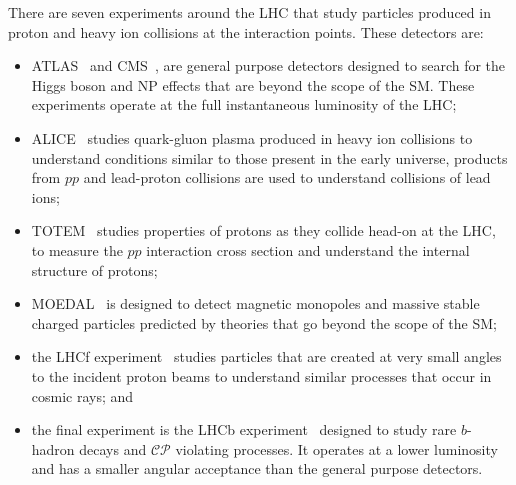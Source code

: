There are seven experiments around the LHC that study particles produced in proton and heavy ion collisions at the interaction points. These detectors are: %
\begin{itemize}
\item ATLAS~\cite{Aad:2008zzm} and CMS~\cite{Chatrchyan:2008aa}, are general purpose detectors designed to search for the Higgs boson and NP effects that are beyond the scope of the SM. These experiments operate at the full instantaneous luminosity of the LHC; %
\item ALICE~\cite{Aamodt:2008zz} studies quark-gluon plasma produced in heavy ion collisions to understand conditions similar to those present in the early universe, products from $pp$ and lead-proton collisions are used to understand collisions of lead ions;
\item  TOTEM~\cite{Anelli:2008zza} studies properties of protons as they collide head-on at the LHC, to measure the $pp$ interaction cross section and understand the internal structure of protons; %
\item MOEDAL~\cite{Pinfold:2009oia} is designed to detect magnetic monopoles and massive stable charged particles predicted by theories that go beyond the scope of the SM;
\item the LHCf experiment~\cite{Adriani:2008zz} studies particles that are created at very small angles to the incident proton beams to understand similar processes that occur in cosmic rays; and %
\item the final experiment is the LHCb experiment~\cite{Alves:2008zz} designed to study rare $b$-hadron decays and $\mathcal{CP}$ violating processes. It operates at a lower luminosity and has a smaller angular acceptance than the general purpose detectors. 
\end{itemize}

